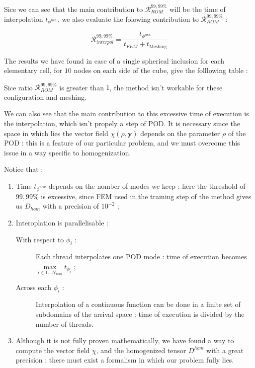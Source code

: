 {Sice we can see that the main contribution to $\mathcal{R}_{ROM}^{99,99\%}$ will be the time of interpolation $t_{\phi^{new}}$, %
we also evaluate the folowing contribution to $\mathcal{R}_{ROM}^{99,99\%}$ :

\begin{equation}
\label{eval_interp}
\mathcal{R}_{interpol}^{99,99\%}=\dfrac{t_{\phi^{new}}}{t_{FEM}+t_{\text{Meshing}}}
\end{equation}

The results we have found in case of a single spherical inclusion for each elementary cell, for $10$ nodes on each side of the cube, give the folllowing table :



\etoile
\newlength{\currentparskip}
\setlength{\currentparskip}{\parskip}
\begin{minipage}{\linewidth}
\setlength{\parskip}{\currentparskip}
Sice ratio $\mathcal{R}_{ROM}^{99,99\%}$ is greater than $1$, the method isn't workable for these configuration and meshing.

\par
We can also see that the main contribution to this excessive time of execution is the interpolation, which isn't propely a step of POD. %
It is necessary since the space in which lies the vector field $\chi(\rho,\mathbf{y})$ depends on the parameter $\rho$ of the POD : %
this is a feature of our particular problem, and we must overcome this issue in a way specific to homogenization.

\par
Notice that :

\begin{enumerate}[label=(interp \roman*)]
\item Time $t_{\phi^{new}}$ depends on the nomber of modes we keep : here the threshold of $99,99\%$ is excessive, since FEM used in the training step of the method gives us $D_{hom}$ with a precision of $10^{-2}$ ;
\item Interoplation is parallelisable :
\begin{description}
\item [With respect to $\phi_i$ :] Each thread interpolates one POD mode : time of execution becomes $\max\limits_{i\in 1\dots N_{rom}}t_{\phi_i}$ ;
\item [Across each $\phi_i$ :] Interpolation of a continuous function can be done in a finite set of subdomains of the arrival space : %
time of execution is divided by the number of threads.
\end{description}
\item Although it is not fully proven mathematically, we have found a way to compute the vector field $\chi$, and the homogenized tensor $D^{hom}$ with a great precision : %
there must exist a formalism in which our problem fully lies.
\end{enumerate}
\end{minipage}

}
